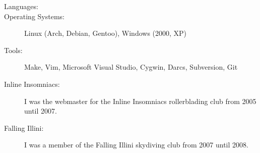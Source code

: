 \documentclass[letterpaper,10pt]{article}
\begin{document}
\begin{description}
\item[Languages:]
\begin{minipage}[t]{6.5in}
\end{minipage}
\item[Operating Systems:] Linux (Arch, Debian, Gentoo), Windows (2000, XP)
\item[Tools:] Make, Vim, Microsoft Visual Studio, Cygwin, Darcs, Subversion, Git
\end{description}
\begin{description}
\item[Inline Insomniacs:] I was the webmaster for the Inline Insomniacs rollerblading club from 2005 until 2007.
\item[Falling Illini:] I was a member of the Falling Illini skydiving club from 2007 until 2008.
\end{description}
\end{document}
